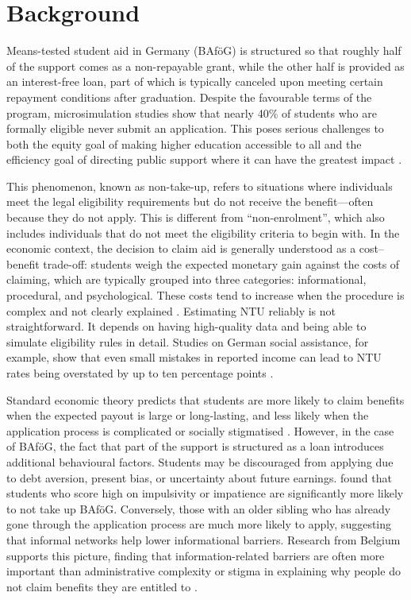 
\section{Background}
\label{section:theoretical_empirical_context}
Means-tested student aid in Germany (BAföG) is structured so that roughly half of the support comes as a non-repayable grant, while the other half is provided as an interest-free loan, part of which is typically canceled upon meeting certain repayment conditions after graduation. 
Despite the favourable terms of the program, microsimulation studies show that nearly 40\% of students who are formally eligible never submit an application. 
This poses serious challenges to both the equity goal of making higher education accessible to all and the efficiency goal of directing public support where it can have the greatest impact \citep{herber_non-take-up_2019}.

This phenomenon, known as non-take-up, refers to situations where individuals meet the legal eligibility requirements but do not receive the benefit—often because they do not apply.
This is different from “non-enrolment”, which also includes individuals that do not meet the eligibility criteria to begin with.
In the economic context, the decision to claim aid is generally understood as a cost–benefit trade-off: students weigh the expected monetary gain against the costs of claiming, which are typically grouped into three categories: informational, procedural, and psychological. 
These costs tend to increase when the procedure is complex and not clearly explained \citep{booij_role_2012}. Estimating NTU reliably is not straightforward. It depends on having high-quality data and being able to simulate eligibility rules in detail. Studies on German social assistance, for example, show that even small mistakes in reported income can lead to NTU rates being overstated by up to ten percentage points \citep{frick_claim_2007}.

Standard economic theory predicts that students are more likely to claim benefits when the expected payout is large or long-lasting, and less likely when the application process is complicated or socially stigmatised \citep{booij_role_2012}. However, in the case of BAföG, the fact that part of the support is structured as a loan introduces additional behavioural factors. Students may be discouraged from applying due to debt aversion, present bias, or uncertainty about future earnings. \cite{herber_non-take-up_2019} found that students who score high on impulsivity or impatience are significantly more likely to not take up BAföG. Conversely, those with an older sibling who has already gone through the application process are much more likely to apply, suggesting that informal networks help lower informational barriers. Research from Belgium supports this picture, finding that information-related barriers are often more important than administrative complexity or stigma in explaining why people do not claim benefits they are entitled to \citep{fidan_why_2021, herber_non-take-up_2019, bolland_information_nodate}.

